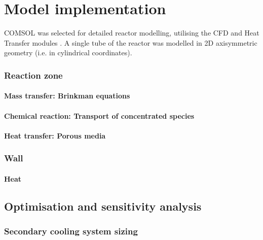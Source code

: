 \section{Model implementation}

COMSOL was selected for detailed reactor modelling, utilising the CFD and Heat Transfer modules \cite{comsol_comsol_2020,comsol_cfd_2020,comsol_heat_2020}. A single tube of the reactor was modelled in 2D axisymmetric geometry (i.e. in cylindrical coordinates). 

\subsubsection{Reaction zone}

\paragraph{Mass transfer: Brinkman equations}

\paragraph{Chemical reaction: Transport of concentrated species}

\paragraph{Heat transfer: Porous media}

\subsubsection{Wall}

\paragraph{Heat }

\subsection{Optimisation and sensitivity analysis}

\subsubsection{Secondary cooling system sizing}

